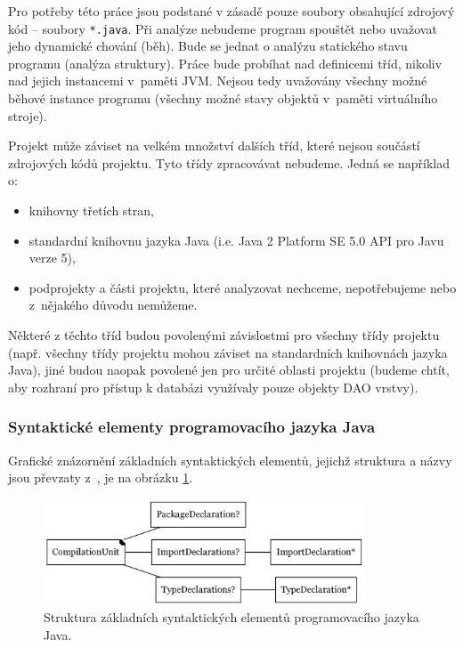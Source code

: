 Pro potřeby této práce jsou podstané v zásadě pouze soubory obsahující zdrojový kód -- soubory \verb+*.java+. Při analýze nebudeme program spouštět nebo uvažovat jeho dynamické chování (běh). Bude se jednat o analýzu statického stavu programu (analýza struktury). Práce bude probíhat nad definicemi tříd, nikoliv nad jejich instancemi v~paměti JVM. Nejsou tedy uvažovány všechny možné běhové instance programu (všechny možné stavy objektů v~paměti virtuálního stroje).

Projekt může záviset na velkém množství dalších tříd, které nejsou součástí zdrojových kódů projektu. Tyto třídy zpracovávat nebudeme. Jedná se například o:

\begin{itemize}
\item knihovny třetích stran,
\item standardní knihovnu jazyka Java (i.e. Java 2 Platform SE 5.0 API pro Javu verze 5),
\item podprojekty a části projektu, které analyzovat nechceme, nepotřebujeme nebo z~nějakého důvodu nemůžeme.
\end{itemize}

Některé z těchto tříd budou povolenými závislostmi pro všechny třídy projektu (např. všechny třídy projektu mohou záviset na standardních knihovnách jazyka Java), jiné budou naopak povolené jen pro určité oblasti projektu (budeme chtít, aby rozhraní pro přístup k databázi využívaly pouze objekty DAO vrstvy).

\subsubsection{Syntaktické elementy programovacího jazyka Java}
\label{analysis-java_grammar_elements}

Grafické znázornění základních syntaktických elementů, jejichž struktura a názvy jsou převzaty z~\cite{Gosling:2005:JLS:1036643}, je na obrázku \ref{toplevel_elements}.

\begin{figure}[h!]
  \centering
  \includegraphics[width=0.85\textwidth]{./graphs/java_top_elements.png}
  \caption{Struktura základních syntaktických elementů programovacího jazyka Java.\label{toplevel_elements}}
\end{figure}

